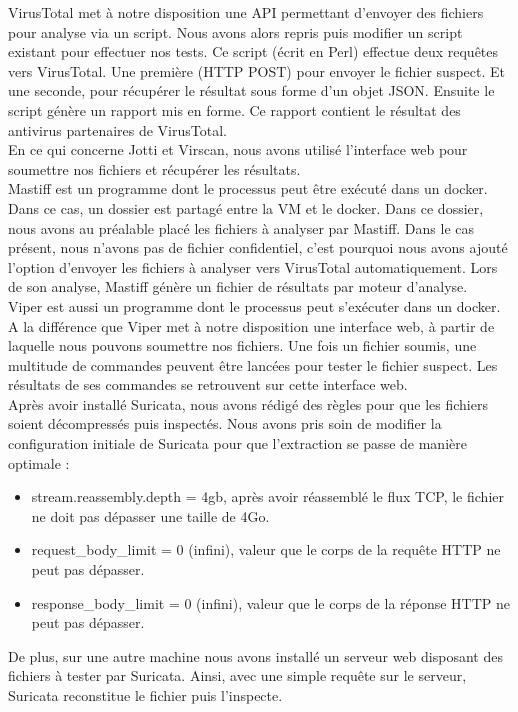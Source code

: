 \documentclass[smallextended]{svjour3}       %
\begin{document}
$ $\\
VirusTotal met à notre disposition une API permettant d'envoyer des fichiers pour analyse via un script. Nous avons alors repris puis modifier un script existant pour effectuer nos tests. Ce script (écrit en Perl) effectue deux requêtes vers VirusTotal. Une première (HTTP POST) pour envoyer le fichier suspect. Et une seconde, pour récupérer le résultat sous forme d'un objet JSON. Ensuite le script génère un rapport mis en forme. Ce rapport contient le résultat des antivirus partenaires de VirusTotal.\\
$ $\\
En ce qui concerne Jotti et Virscan, nous avons utilisé l'interface web pour soumettre nos fichiers et récupérer les résultats.\\
$ $\\
Mastiff est un programme dont le processus peut être exécuté dans un docker. Dans ce cas, un dossier est partagé entre la VM et le docker. Dans ce dossier, nous avons au préalable placé les fichiers à analyser par Mastiff. Dans le cas présent, nous n'avons pas de fichier confidentiel, c'est pourquoi nous avons ajouté l'option d'envoyer les fichiers à analyser vers VirusTotal automatiquement. Lors de son analyse, Mastiff génère un fichier de résultats par moteur d'analyse.\\
$ $\\
Viper est aussi un programme dont le processus peut s’exécuter dans un docker. A la différence que Viper met à notre disposition une interface web, à partir de laquelle nous pouvons soumettre nos fichiers. Une fois un fichier soumis, une multitude de commandes peuvent être lancées pour tester le fichier suspect. Les résultats de ses commandes se retrouvent sur cette interface web.\\
$ $\\
Après avoir installé Suricata, nous avons rédigé des règles pour que les fichiers soient décompressés puis inspectés. Nous avons pris soin de modifier la configuration initiale de Suricata pour que l'extraction se passe de manière optimale :
\begin{itemize}
\item stream.reassembly.depth = 4gb, après avoir réassemblé le flux TCP, le fichier ne doit pas dépasser une taille de 4Go.
\item request\_body\_limit = 0 (infini), valeur que le corps de la requête HTTP ne peut pas dépasser.
\item response\_body\_limit = 0 (infini), valeur que le corps de la réponse HTTP ne peut pas dépasser.
\end{itemize}
De plus, sur une autre machine nous avons installé un serveur web disposant des fichiers à tester par Suricata. Ainsi, avec une simple requête sur le serveur, Suricata reconstitue le fichier puis l'inspecte.
\end{document}
